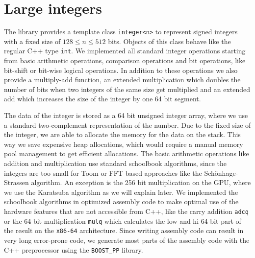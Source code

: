\documentclass[oribibl,a4paper]{llncs2e/llncs}
\begin{document}

\section{Large integers}
The library provides a template class \verb|integer<n>| to represent signed integers with a fixed size of $128 \le n \le 512$ bits.
Objects of this class behave like the regular C++ type \verb|int|.
We implemented all standard integer operations starting from basic arithmetic operations, comparison operations and bit operations, like bit-shift or bit-wise logical operations.
In addition to these operations we also provide a multiply-add function, an extended multiplication which doubles the number of bits when two integers of the same size get multiplied and an extended add which increases the size of the integer by one 64 bit segment.

The data of the integer is stored as a 64 bit unsigned integer array, where we use a standard two-complement representation of the number.
Due to the fixed size of the integer, we are able to allocate the memory for the data on the stack.
This way we save expensive heap allocations, which would require a manual memory pool management to get efficient allocations.
The basic arithmetic operations like addition and multiplication use standard schoolbook algorithms, since the integers are too small for Toom\cite{Toom} or FFT based approaches like the Sch\"onhage-Strassen algorithm\cite{Schonhage}.
An exception is the 256 bit multiplication on the GPU, where we use the Karatsuba algorithm \cite{Karatsuba1963} as we will explain later.
We implemented the schoolbook algorithms in optimized assembly code to make optimal use of the hardware features that are not accessible from C++, like the carry addition \verb|adcq| or the 64 bit multiplication \verb|mulq| which calculates the low and hi 64 bit part of the result on the \verb|x86-64| architecture.
Since writing assembly code can result in very long error-prone code, we generate most parts of the assembly code with the C++ preprocessor using the \verb|BOOST_PP| library.
\end{document}
